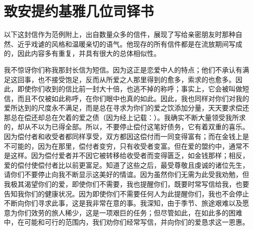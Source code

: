 
\chapter{致安提约基雅几位司铎书}


以下这封信作为范例附上，出自数量众多的信件，展现了写给亲密朋友时那种自然、近乎戏谑的风格和温暖亲切的语气。他现存的所有信件都是在流放期间写成的，因此内容多有重复，并具有很大的总体相似性。\par

\par

我不惊讶你们称我那封长信为短信。因为这正是恋爱中人的特点；他们不承认有满足这回事，也不接受饱足，反而从所爱之人那里得到的愈多，索求的也愈多。因此，即使你们收到的信比前一封大十倍，也逃不掉的称呼；事实上，它会被叫做短信，而且不仅被如此称呼，在你们眼中也真的如此。因此，我也同样对你们对我的爱所达到的尺度永不满足，而是总在寻求为你们的爱之饮添加分量，天天要求偿还那总在偿还却总在欠着的爱之债（因为经上记载：）。我确实不断大量领受我所求的，却从不以为已得全部。所以，不要停止偿付这笔好债务，它有着双重的喜乐。因为偿付者和收受者都同样享受，双方都因这偿付而一同变得富有；而在金钱上是不可能的，因为在那里，偿付者变穷，只有收受者变富。但在爱的盟约中，通常不是这样。因为偿付爱者并不因它被转移给收受者而变得匮乏，如金钱那样；相反，爱的偿付使偿付者比以前更富足。知道了这些之后，最受尊敬且虔诚的诸位先生，请你们不要停止向我不断显示这美好的情谊。因为虽然你们无需为此受我劝勉，但我极其渴望你们的爱，即使你们不需要，我也提醒你们，既要时常写信给我，也要告知我你们的健康状况。因为即使你们不需要任何人为此提醒你们，我也不会停止不断向你们寻求此事，这是我非常在意的事。我深知，由于季节、旅途艰难以及愿意为你们效劳的旅人稀少，这是一项艰巨的任务；但尽管如此，在如此多的困难中，在可能和可行的范围内，我们劝你们经常写信，并向你们的爱恳求这一恩惠。\par

